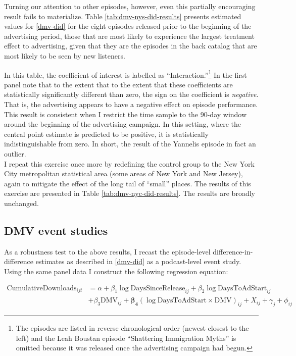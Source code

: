 \documentclass[11pt, letterpaper, twoside]{article}
\begin{document}
Turning our attention to other episodes, however, even this partially encouraging result fails to materialize. Table \ref{tab:dmv-nys-did-results} presents estimated values for \eqref{dmv-did} for the eight episodes released prior to the beginning of the advertising period, those that are most likely to experience the largest treatment effect to advertising, given that they are the episodes in the back catalog that are most likely to be seen by new listeners.\\

\begin{landscape}
  
\end{landscape}

In this table, the coefficient of interest is labelled as ``Interaction.''\footnote{The episodes are listed in reverse chronological order (newest closest to the left) and the Leah Boustan episode ``Shattering Immigration Myths'' is omitted because it was released once the advertising campaign had begun.} In the first panel note that to the extent that to the extent that these coefficients are statistically significantly different than zero, the sign on the coefficient is \textit{negative}. That is, the advertising appears to have a negative effect on episode performance. This result is consistent when I restrict the time sample to the 90-day window around the beginning of the advertising campaign. In this setting, where the central point estimate is predicted to be positive, it is statistically indistinguishable from zero. In short, the result of the Yannelis episode in fact an outlier.\\

I repeat this exercise once more by redefining the control group to the New York City metropolitan statistical area (some areas of New York and New Jersey), again to mitigate the effect of the long tail of ``small'' places. The results of this exercise are presented in Table \ref{tab:dmv-nyc-did-results}. The results are broadly unchanged.

\subsection{DMV event studies}
As a robustness test to the above results, I recast the episode-level difference-in-difference estimates as described in \eqref{dmv-did} as a podcast-level event study. Using the same panel data I construct the following regression equation:

\begin{align}
  \label{event-study-fe}
  \text{CumulativeDownloads}_{ijt} &= \alpha + \beta_1\log{\text{DaysSinceRelease}}_{ij} + \beta_2\log{\text{DaysToAdStart}}_{ij}  \\ \nonumber
    &+ \beta_3\text{DMV}_{ij} + \mathbf{\beta_4}(\log{\text{DaysToAdStart}} \times \text{DMV})_{ij} + X_{ij} + \gamma_j + \phi_{ij}
\end{align}
\end{document}

